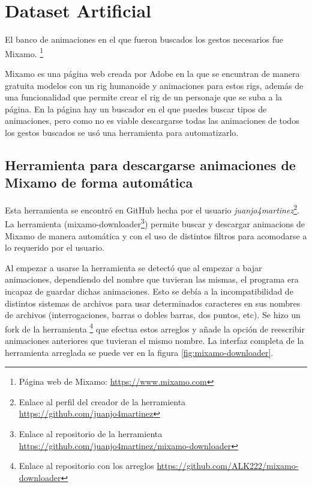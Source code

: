 \section{Dataset Artificial}
\label{sec:datasetArtificial}

El banco de animaciones en el que fueron buscados los gestos necesarios fue Mixamo. \footnote{Página web de Mixamo: \url{https://www.mixamo.com}}

Mixamo es una página web creada por Adobe en la que se encuntran de manera gratuita modelos con un \gls{rig} humanoide y animaciones para estos rigs, además de una funcionalidad que permite crear el \gls{rig} de un personaje que se suba a la página.
En la página hay un buscador en el que puedes buscar tipos de animaciones, pero como no es viable descargarse todas las animaciones de todos los gestos buscados se usó una herramienta para automatizarlo.

\subsection{Herramienta para descargarse animaciones de Mixamo de forma automática}

Esta herramienta se encontró en GitHub hecha por el usuario \textit{juanjo4martinez}\footnote{Enlace al perfil del creador de la herramienta \url{https://github.com/juanjo4martinez}}. La herramienta (mixamo-downloader\footnote{Enlace al repositorio de la herramienta \url{https://github.com/juanjo4martinez/mixamo-downloader}}) permite buscar y descargar animacions de Mixamo de manera automática y con el uso de distintos filtros para acomodarse a lo requerido por el usuario.

Al empezar a usarse la herramienta se detectó que al empezar a bajar animaciones, dependiendo del nombre que tuvieran las mismas, el programa era incapaz de guardar dichas animaciones. Esto se debía a la incompatibilidad de distintos sistemas de archivos para usar determinados caracteres en sus nombres de archivos (interrogaciones, barras o dobles barras, dos puntos, etc). Se hizo un \gls{fork} de la herramienta \footnote{Enlace al repositorio con los arreglos \url{https://github.com/ALK222/mixamo-downloader}} que efectua estos arreglos y añade la opción de reescribir animaciones anteriores que tuvieran el mismo nombre. La interfaz completa de la herramienta arreglada se puede ver en la figura \ref{fig:mixamo-downloader}.

